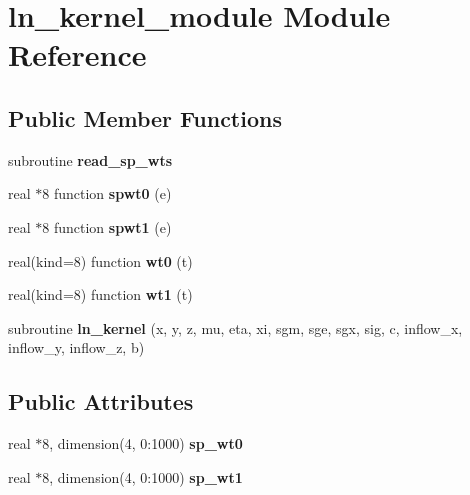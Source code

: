 \hypertarget{classln__kernel__module}{\section{ln\-\_\-kernel\-\_\-module Module Reference}
\label{classln__kernel__module}
}
\subsection*{Public Member Functions}
\begin{DoxyCompactItemize}
\item 
\hypertarget{classln__kernel__module_aad8f2e59c335886b3a8a50e3f132eaa5}{subroutine {\bfseries read\-\_\-sp\-\_\-wts}}\label{classln__kernel__module_aad8f2e59c335886b3a8a50e3f132eaa5}

\item 
\hypertarget{classln__kernel__module_a2714ae332964aba16f4bf2490d4ad586}{real $\ast$8 function {\bfseries spwt0} (e)}\label{classln__kernel__module_a2714ae332964aba16f4bf2490d4ad586}

\item 
\hypertarget{classln__kernel__module_a96ab2ee2973c0667493bf3d5fd00ba04}{real $\ast$8 function {\bfseries spwt1} (e)}\label{classln__kernel__module_a96ab2ee2973c0667493bf3d5fd00ba04}

\item 
\hypertarget{classln__kernel__module_a9ab6aa3cccdaf9b53a929dd30a31961b}{real(kind=8) function {\bfseries wt0} (t)}\label{classln__kernel__module_a9ab6aa3cccdaf9b53a929dd30a31961b}

\item 
\hypertarget{classln__kernel__module_a61433a9c616f7e015071386c1ce8ea4e}{real(kind=8) function {\bfseries wt1} (t)}\label{classln__kernel__module_a61433a9c616f7e015071386c1ce8ea4e}

\item 
\hypertarget{classln__kernel__module_a656058bc673334c98c866f725c8f6c30}{subroutine {\bfseries ln\-\_\-kernel} (x, y, z, mu, eta, xi, sgm, sge, sgx, sig, c, inflow\-\_\-x, inflow\-\_\-y, inflow\-\_\-z, b)}\label{classln__kernel__module_a656058bc673334c98c866f725c8f6c30}

\end{DoxyCompactItemize}
\subsection*{Public Attributes}
\begin{DoxyCompactItemize}
\item 
\hypertarget{classln__kernel__module_acb86edae3ad6ba5f5d76b8480cc1a0c3}{real $\ast$8, dimension(4, 0\-:1000) {\bfseries sp\-\_\-wt0}}\label{classln__kernel__module_acb86edae3ad6ba5f5d76b8480cc1a0c3}

\item 
\hypertarget{classln__kernel__module_a0b4b87e5c568b8a78eaababf7fc2ffba}{real $\ast$8, dimension(4, 0\-:1000) {\bfseries sp\-\_\-wt1}}\label{classln__kernel__module_a0b4b87e5c568b8a78eaababf7fc2ffba}

\end{DoxyCompactItemize}


